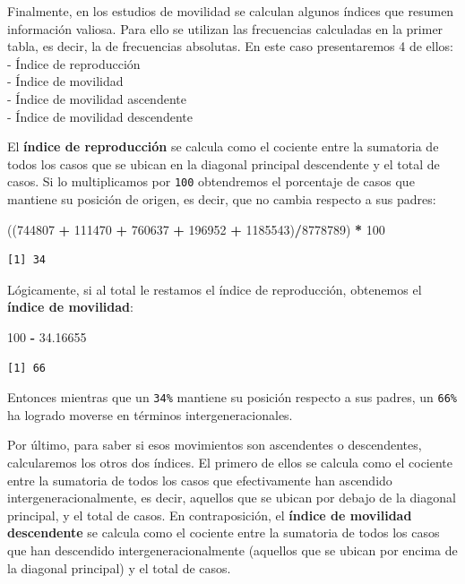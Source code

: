 \documentclass[
]{article}
\newenvironment{Shaded}{\begin{snugshade}}{\end{snugshade}}
\newcommand{\DecValTok}[1]{\textcolor[rgb]{0.00,0.00,0.81}{#1}}
\newcommand{\FloatTok}[1]{\textcolor[rgb]{0.00,0.00,0.81}{#1}}
\newcommand{\NormalTok}[1]{#1}
\newcommand{\SpecialCharTok}[1]{\textcolor[rgb]{0.81,0.36,0.00}{\textbf{#1}}}
\begin{document}
Finalmente, en los estudios de movilidad se calculan algunos índices que resumen información valiosa. Para ello se utilizan las frecuencias calculadas en la primer tabla, es decir, la de frecuencias absolutas. En este caso presentaremos 4 de ellos:\\
- Índice de reproducción\\
- Índice de movilidad\\
- Índice de movilidad ascendente\\
- Índice de movilidad descendente

El \textbf{índice de reproducción} se calcula como el cociente entre la sumatoria de todos los casos que se ubican en la diagonal principal descendente y el total de casos. Si lo multiplicamos por \texttt{100} obtendremos el porcentaje de casos que mantiene su posición de origen, es decir, que no cambia respecto a sus padres:

\begin{Shaded}
\begin{Highlighting}[]
\NormalTok{((}\DecValTok{744807} \SpecialCharTok{+} \DecValTok{111470} \SpecialCharTok{+} \DecValTok{760637} \SpecialCharTok{+} \DecValTok{196952} \SpecialCharTok{+} \DecValTok{1185543}\NormalTok{)}\SpecialCharTok{/}\DecValTok{8778789}\NormalTok{) }\SpecialCharTok{*} \DecValTok{100}
\end{Highlighting}
\end{Shaded}

\begin{verbatim}
[1] 34
\end{verbatim}

Lógicamente, si al total le restamos el índice de reproducción, obtenemos el \textbf{índice de movilidad}:

\begin{Shaded}
\begin{Highlighting}[]
\DecValTok{100} \SpecialCharTok{{-}} \FloatTok{34.16655}
\end{Highlighting}
\end{Shaded}

\begin{verbatim}
[1] 66
\end{verbatim}

Entonces mientras que un \texttt{34\%} mantiene su posición respecto a sus padres, un \texttt{66\%} ha logrado moverse en términos intergeneracionales.

Por último, para saber si esos movimientos son ascendentes o descendentes, calcularemos los otros dos índices. El primero de ellos se calcula como el cociente entre la sumatoria de todos los casos que efectivamente han ascendido intergeneracionalmente, es decir, aquellos que se ubican por debajo de la diagonal principal, y el total de casos. En contraposición, el \textbf{índice de movilidad descendente} se calcula como el cociente entre la sumatoria de todos los casos que han descendido intergeneracionalmente (aquellos que se ubican por encima de la diagonal principal) y el total de casos.
\end{document}
